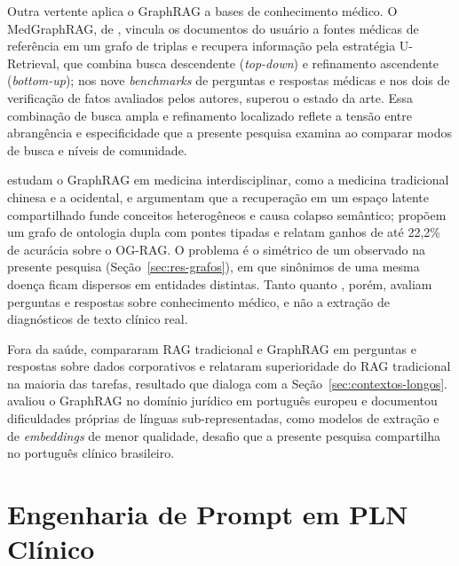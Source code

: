 Outra vertente aplica o GraphRAG a bases de conhecimento médico. O MedGraphRAG, de \citet{wu2025}, vincula os documentos do usuário a fontes médicas de referência em um grafo de triplas e recupera informação pela estratégia U-Retrieval, que combina busca descendente (\textit{top-down}) e refinamento ascendente (\textit{bottom-up}); nos nove \textit{benchmarks} de perguntas e respostas médicas e nos dois de verificação de fatos avaliados pelos autores, superou o estado da arte. Essa combinação de busca ampla e refinamento localizado reflete a tensão entre abrangência e especificidade que a presente pesquisa examina ao comparar modos de busca e níveis de comunidade.

\citet{wang2026} estudam o GraphRAG em medicina interdisciplinar, como a medicina tradicional chinesa e a ocidental, e argumentam que a recuperação em um espaço latente compartilhado funde conceitos heterogêneos e causa colapso semântico; propõem um grafo de ontologia dupla com pontes tipadas e relatam ganhos de até 22,2\% de acurácia sobre o OG-RAG. O problema é o simétrico de um observado na presente pesquisa (Seção~\ref{sec:res-grafos}), em que sinônimos de uma mesma doença ficam dispersos em entidades distintas. Tanto \citet{wu2025} quanto \citet{wang2026}, porém, avaliam perguntas e respostas sobre conhecimento médico, e não a extração de diagnósticos de texto clínico real.

Fora da saúde, \citet{rakuljic2026} compararam RAG tradicional e GraphRAG em perguntas e respostas sobre dados corporativos e relataram superioridade do RAG tradicional na maioria das tarefas, resultado que dialoga com a Seção~\ref{sec:contextos-longos}. \citet{esteves2025} avaliou o GraphRAG no domínio jurídico em português europeu e documentou dificuldades próprias de línguas sub-representadas, como modelos de extração e de \textit{embeddings} de menor qualidade, desafio que a presente pesquisa compartilha no português clínico brasileiro.

\section{Engenharia de Prompt em PLN Clínico}\label{sec:relacionados-prompt}


